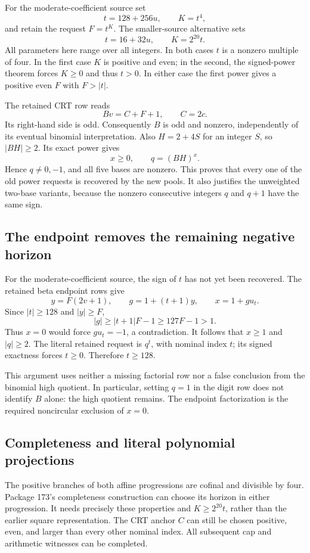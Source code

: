For the moderate-coefficient source set
\[
 t=128+256u,\qquad K=t^4,
\]
and retain the request $F=t^K$. The smaller-source alternative sets
\[
 t=16+32u,\qquad K=2^{20}t.
\]
All parameters here range over all integers. In both cases $t$ is a nonzero
multiple of four. In the first case $K$ is positive and even; in the second,
the signed-power theorem forces $K\ge0$ and thus $t>0$. In either case the
first power gives a positive even $F$ with $F>|t|$.

The retained CRT row reads
\[
 Bv=C+F+1,\qquad C=2c.
\]
Its right-hand side is odd. Consequently $B$ is odd and nonzero, independently
of its eventual binomial interpretation. Also $H=2+4S$ for an integer $S$,
so $|BH|\ge2$. Its exact power gives
\[
 x\ge0,\qquad q=(BH)^x.
\]
Hence $q\ne0,-1$, and all five bases are nonzero. This proves that every
one of the old power requests is recovered by the new pools. It also justifies
the unweighted two-base variants, because the nonzero consecutive integers
$q$ and $q+1$ have the same sign.

\subsection{The endpoint removes the remaining negative horizon}

For the moderate-coefficient source, the sign of $t$ has not yet been
recovered. The retained beta endpoint rows give
\[
 y=F(2v+1),\qquad g=1+(t+1)y,\qquad x=1+g u_t.
\]
Since $|t|\ge128$ and $|y|\ge F$,
\[
 |g|\ge |t+1|F-1\ge127F-1>1.
\]
Thus $x=0$ would force $g u_t=-1$, a contradiction. It follows that $x\ge1$
and $|q|\ge2$. The literal retained request is $q^t$, with nominal index
$t$; its signed exactness forces $t\ge0$. Therefore $t\ge128$.

This argument uses neither a missing factorial row nor a false conclusion
from the binomial high quotient. In particular, setting $q=1$ in the digit
row does not identify $B$ alone: the high quotient remains. The endpoint
factorization is the required noncircular exclusion of $x=0$.

\subsection{Completeness and literal polynomial projections}

The positive branches of both affine progressions are cofinal and divisible
by four. Package 173's completeness construction can choose its horizon in
either progression. It needs precisely these properties and
$K\ge2^{20}t$, rather than the earlier square representation. The CRT anchor
$C$ can still be chosen positive, even, and larger than every other nominal
index. All subsequent cap and arithmetic witnesses can be completed.


